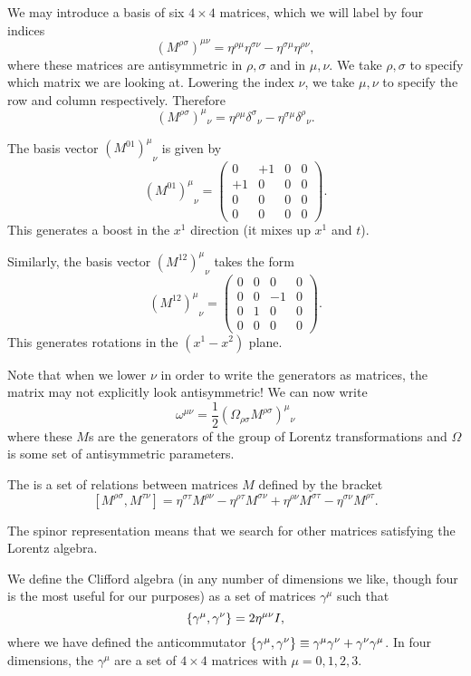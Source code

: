 We may introduce a basis of six $4\times 4$ matrices, which we will label by four indices
$$(M^{\rho\sigma})^{\mu\nu}=\eta^{\rho\mu}\eta^{\sigma\nu}-\eta^{\sigma\mu}\eta^{\rho\nu},$$
where these matrices are antisymmetric in $\rho,\sigma$ and in $\mu,\nu$. We take $\rho,\sigma$ to specify which matrix we are looking at. Lowering the index $\nu$, we take $\mu,\nu$ to specify the row and column respectively. Therefore
$$(M^{\rho\sigma})^\mu{}_\nu=\eta^{\rho\mu}\delta^\sigma{}_\nu-\eta^{\sigma\mu}\delta^\rho{}_\nu.$$
\begin{exm}
The basis vector ${(M^{01})^\mu}_\nu$ is given by
$${(M^{01})^\mu}_\nu=
\begin{pmatrix}
0&+1&0&0\\
+1&0&0&0\\
0&0&0&0\\
0&0&0&0
\end{pmatrix}.$$
This generates a boost in the $x^1$ direction (it mixes up $x^1$ and $t$).

Similarly, the basis vector ${(M^{12})^\mu}_\nu$ takes the form
$${(M^{12})^\mu}_\nu=
\begin{pmatrix}
0&0&0&0\\
0&0&-1&0\\
0&1&0&0\\
0&0&0&0
\end{pmatrix}.$$
This generates rotations in the $(x^1-x^2)$ plane.
\end{exm}
Note that when we lower $\nu$ in order to write the generators as matrices, the matrix may not explicitly look antisymmetric! We can now write
$$\omega^{\mu\nu}=\frac{1}{2}(\Omega_{\rho\sigma}M^{\rho\sigma})^\mu{}_\nu$$
where these $M$s are the generators of the group of Lorentz transformations and $\Omega$ is some set of antisymmetric parameters.
\begin{defn}
The  is a set of relations between matrices $M$ defined by the bracket
$$[M^{\rho\sigma},M^{\tau\nu}]=\eta^{\sigma\tau}M^{\rho\nu}-\eta^{\rho\tau}M^{\sigma\nu}+\eta^{\rho\nu}M^{\sigma\tau}-\eta^{\sigma\nu}M^{\rho\tau}.$$
\end{defn}

The spinor representation means that we search for other matrices satisfying the Lorentz algebra. 
\begin{defn}
We define the Clifford algebra (in any number of dimensions we like, though four is the most useful for our purposes) as a set of matrices $\gamma^\mu$ such that
$$\{\gamma^\mu,\gamma^\nu\}=2\eta^{\mu\nu} I,$$
where we have defined the anticommutator $\{\gamma^\mu,\gamma^\nu\}\equiv\gamma^\mu \gamma^\nu+\gamma^\nu\gamma^\mu$. In four dimensions, the $\gamma^\mu$ are a set of $4\times 4$ matrices with $\mu=0,1,2,3$.
\end{defn}

